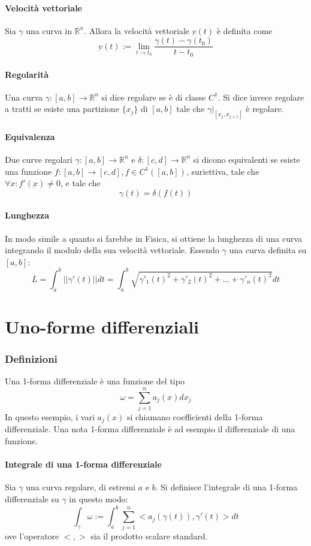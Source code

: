 \documentclass[a4paper,12pt]{article}
\begin{document}
\paragraph{Velocità vettoriale}
Sia $\gamma$ una curva in $\mathbb{R}^n$. Allora la velocità vettoriale $\underbar{v}(t)$ è definita come
$$\underbar{v}(t) := \lim_{t\to t_0} \dfrac{\gamma(t)-\gamma(t_0)}{t-t_0}$$

\paragraph{Regolarità}
Una curva $\gamma:[a,b]\rightarrow\mathbb{R}^n$ si dice regolare se è di classe $C^1$. Si dice invece regolare a tratti se esiste una partizione $\{x_j\}$ di $[a,b]$ tale che $\gamma|_{[x_j, x_{j+1}]}$ è regolare.
\paragraph{Equivalenza}
Due curve regolari $\gamma :[a,b]\rightarrow\mathbb{R}^n$ e $\delta :[c,d]\rightarrow\mathbb{R}^n$ si dicono equivalenti se esiste una funzione 
$f:[a,b]\rightarrow[c,d], f \in C^1([a,b])$, suriettiva, tale che $\forall x: f'(\underbar{x}) \neq 0$, e tale che
$$\gamma(t) = \delta(f(t))$$
\paragraph{Lunghezza}
In modo simile a quanto si farebbe in Fisica, si ottiene la lunghezza di una curva integrando il modulo della sua velocità vettoriale. Essendo $\gamma$ una curva definita su $[a, b]$:
$$L= \int_a^b ||\gamma'(t)|| dt = \int_a^b\sqrt{\gamma'_1(t)^2+\gamma'_2(t)^2+...+\gamma'_n(t)^2}dt$$


\section{Uno-forme differenziali}
\subsubsection{Definizioni}
Una 1-forma differenziale è una funzione del tipo
$$\omega = \sum_{j=1}^n a_j(x)dx_j$$
In questo esempio, i vari $a_j(x)$ si chiamano coefficienti della 1-forma differenziale.
Una nota 1-forma differenziale è ad esempio il differenziale di una funzione.
\paragraph{Integrale di una 1-forma differenziale}
Sia $\gamma$ una curva regolare, di estremi $a$ e $b$.
Si definisce l'integrale di una 1-forma differenziale su $\gamma$ in questo modo:
$$\int_\gamma \omega:=\int_a^b \sum_{j=1}^n <a_j(\gamma(t)), \gamma'(t)> dt$$
ove l'operatore $<,>$ sia il prodotto scalare standard.
\end{document}
